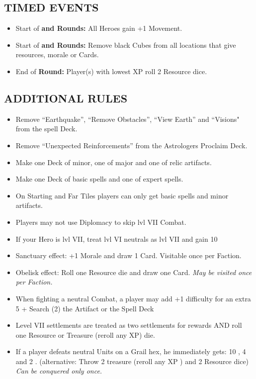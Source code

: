 \begin{multicols*}{2}
\subsection*{\MakeUppercase{Timed Events}}

\begin{itemize}
  \item Start of \textbf{ and  Rounds:} All Heroes gain +1 Movement.
  \item Start of \textbf{ and  Rounds:} Remove black Cubes from all locations that give resources, morale or Cards.
  \item End of \textbf{ Round:} Player(s) with lowest XP roll 2 Resource dice.
\end{itemize}

\subsection*{\MakeUppercase{Additional Rules}}
\begin{itemize}
  \item Remove “Earthquake”, “Remove Obstacles”, “View Earth” and “Visions" from the spell Deck.
  \item Remove “Unexpected Reinforcements” from the Astrologers Proclaim Deck.
  \item Make one Deck of minor, one of major and one of relic artifacts.
  \item Make one Deck of basic spells and one of expert spells.
  \item On Starting and Far Tiles players can only get basic spells and minor artifacts.
  \item Players may not use Diplomacy to skip lvl VII Combat.
  \item If your Hero is lvl VII, treat lvl VI neutrals as lvl VII and gain 10 
  \item Sanctuary effect: +1 Morale and draw 1 Card. Visitable once per Faction.
  \item Obelisk effect: Roll one Resource die and draw one Card. \textit{May be visited once per Faction.}
  \item When fighting a neutral Combat, a player may add +1 difficulty for an extra 5  + Search (2) the Artifact or the Spell Deck
  \item Level VII settlements are treated as two settlements for rewards AND roll one Resource or Treasure (reroll any XP) die.
  \item If a player defeats neutral Units on a Grail hex, he immediately gets: 10 , 4  and 2 . (alternative: Throw 2 treasure (reroll any XP ) and 2 Resource dice)  \textit{Can be conquered only once.}

\end{itemize}
\end{multicols*}
